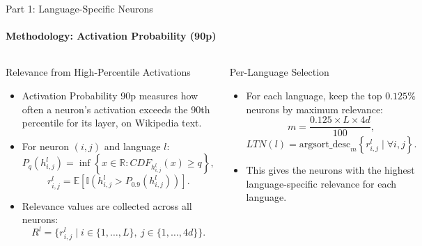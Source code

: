\documentclass[aspectratio=169]{beamer}
\begin{document}
	\begin{frame}{Part 1: Language-Specific Neurons}
		\framesubtitle{Methodology: Activation Probability (90p)}
		\begin{columns}
			\begin{block}{\scriptsize Relevance from High-Percentile Activations}\scriptsize
				\begin{itemize}
					\item Activation Probability 90p measures how often a neuron's activation exceeds the 90th percentile for its layer, on Wikipedia text.
					\item For neuron $(i,j)$ and language $l$:
					\begin{equation}
						P_q(h_{i,j}^l) = \inf \left\{x \in \mathbb{R} : CDF_{h_{i,j}^l}(x) \geq q \right\},
					\end{equation}
					\begin{equation}
						r_{i,j}^l = \mathbb{E}\left[\mathbb{I}\left(h_{i,j}^l > P_{0.9}(h_{i,j}^l)\right)\right].
					\end{equation}
					\item Relevance values are collected across all neurons:
					\begin{equation}
						R^l = \{r_{i,j}^l \mid i \in \{1, \dots, L\},\ j \in \{1, \dots, 4d\}\}.
					\end{equation}
				\end{itemize}
			\end{block}
			\begin{block}{\scriptsize Per-Language Selection}\scriptsize
				\begin{itemize}
					\item For each language, keep the top $0.125\%$ neurons by maximum relevance:
					\begin{equation}
						m = \frac{0.125 \times L \times 4d}{100},
					\end{equation}
					\begin{equation}
						LTN(l) = \text{argsort\_desc}_m \left\{r_{i,j}^l \mid \forall i, j\right\}.
					\end{equation}
					\item This gives the neurons with the highest language-specific relevance for each language.
				\end{itemize}
			\end{block}
		\end{columns}
	\end{frame}
	
\end{document}
